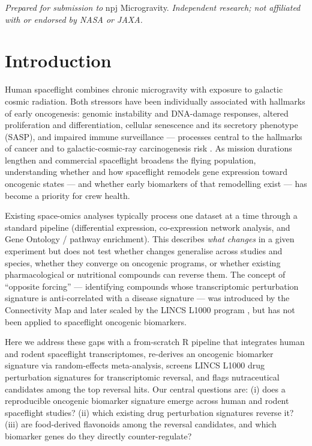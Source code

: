 \documentclass[pdflatex,sn-nature]{sn-jnl}
\begin{document}

\maketitle

\noindent\textit{Prepared for submission to} npj Microgravity. \textit{Independent
research; not affiliated with or endorsed by NASA or JAXA.}

\section{Introduction}\label{sec:intro}

Human spaceflight combines chronic microgravity with exposure to galactic cosmic
radiation. Both stressors have been individually associated with hallmarks of
early oncogenesis: genomic instability and DNA-damage responses, altered
proliferation and differentiation, cellular senescence and its secretory phenotype
(SASP), and impaired immune surveillance --- processes central to the hallmarks of
cancer \cite{hanahan2011} and to galactic-cosmic-ray carcinogenesis risk
\cite{durante2008}. As mission durations lengthen and commercial spaceflight
broadens the flying population, understanding whether and how spaceflight remodels
gene expression toward oncogenic states --- and whether early biomarkers of that
remodelling exist --- has become a priority for crew health.

Existing space-omics analyses typically process one dataset at a time through a
standard pipeline (differential expression, co-expression network analysis, and
Gene Ontology / pathway enrichment). This describes \textit{what changes} in a
given experiment but does not test whether changes generalise across studies and
species, whether they converge on oncogenic programs, or whether existing
pharmacological or nutritional compounds can reverse them. The concept of
``opposite forcing'' --- identifying compounds whose transcriptomic perturbation
signature is anti-correlated with a disease signature --- was introduced by the
Connectivity Map \cite{lamb2006} and later scaled by the LINCS L1000 program
\cite{subramanian2017,duan2023}, but has not been applied to spaceflight oncogenic
biomarkers.

Here we address these gaps with a from-scratch R pipeline that integrates human
and rodent spaceflight transcriptomes, re-derives an oncogenic biomarker signature
via random-effects meta-analysis, screens LINCS L1000 drug perturbation signatures
for transcriptomic reversal, and flags nutraceutical candidates among the top
reversal hits. Our central questions are: (i) does a reproducible oncogenic
biomarker signature emerge across human and rodent spaceflight studies? (ii) which
existing drug perturbation signatures reverse it? (iii) are food-derived flavonoids
among the reversal candidates, and which biomarker genes do they directly
counter-regulate?
\end{document}
